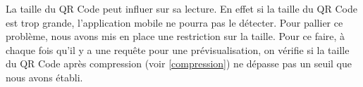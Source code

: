 \par
La taille du QR Code peut influer sur sa lecture. En effet si la taille du QR Code est trop grande, l'application mobile ne pourra pas le détecter. Pour pallier ce problème, nous avons mis en place une restriction sur la taille. Pour ce faire, à chaque fois qu'il y a une requête pour une prévisualisation, on vérifie si la taille du QR Code après compression (voir \ref{compression}) ne dépasse pas un seuil que nous avons établi.\\
